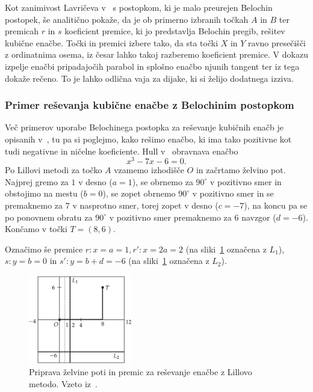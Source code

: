 
Kot zanimivost Lavričeva v~\cite[str.\ 10--13]{lavric2013} s postopkom, ki je malo preurejen Belochin postopek, še analitično pokaže, da je ob primerno izbranih točkah $A$ in $B$ ter premicah $r$ in $s$ koeficient premice, ki jo predstavlja Belochin pregib, rešitev kubične enačbe. Točki in premici izbere tako, da sta točki $X$ in $Y$ ravno presečišči z ordinatnima osema, iz česar lahko takoj razberemo koeficient premice. V dokazu izpelje enačbi pripadajočih parabol in splošno enačbo njunih tangent ter iz tega dokaže rečeno. To je lahko odlična vaja za dijake, ki si želijo dodatnega izziva.

\subsubsection*{Primer reševanja kubične enačbe z Belochinim postopkom}

Več primerov uporabe Belochinega postopka za reševanje kubičnih enačb je opisanih v~\cite[38--44]{zore2022}, tu pa si poglejmo, kako rešimo enačbo, ki ima tako pozitivne kot tudi negativne in ničelne koeficiente. Hull v~\cite[str.\ 90--92]{hull2013} obravnava enačbo
$$ x^3 - 7x - 6 = 0.$$
Po Lillovi metodi za točko $A$ vzamemo izhodišče $O$ in začrtamo želvino pot. Najprej gremo za $1$ v desno ($a=1$), se obrnemo za $90^\circ$ v pozitivno smer in obstojimo na mestu ($b=0$), se zopet obrnemo  $90^\circ$ v pozitivno smer in se premaknemo za $7$ v nasprotno smer, torej zopet v desno ($c=-7$), na koncu pa se po ponovnem obratu za $90^\circ$ v pozitivno smer premaknemo za 6 navzgor ($d=-6$). Končamo v točki $T = (8, 6)$.

Označimo še premice $r: x = a = 1, r': x = 2a = 2$ (na sliki~\ref{fig:lill_primer1} označena z $L_1$), $s: y = b = 0$ in $s': y = b + d = -6$ (na sliki~\ref{fig:lill_primer1} označena z $L_2$).

\begin{figure}[h]
    \centering
    \includegraphics[width=0.4\textwidth]{images/kubična enačba/lill_primer_setup.png}
    \caption[Primer reševanja z Lillovo metodo (priprava)]{Priprava želvine poti in premic za reševanje enačbe z Lillovo metodo. Vzeto iz~\cite[str. 87]{hull2013}.}
    \label{fig:lill_primer1}
\end{figure}

